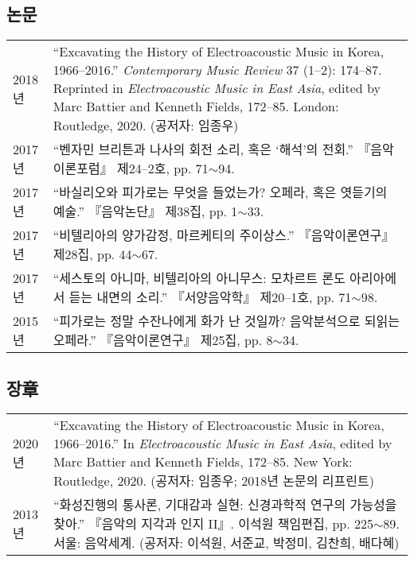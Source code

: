 \documentclass[dvipdfmx,a4paper]{article}
\begin{document}
  \subsection*{\small 논문}
  \hspace*{-0.25cm}
  \begin{tabular}{p{3.0cm} p{11cm}}
    2018년 & “Excavating the History of Electroacoustic Music in Korea, 1966–2016.” \textit{Contemporary Music Review} 37 (1–2): 174–87. Reprinted in \textit{Electroacoustic Music in East Asia}, edited by Marc Battier and Kenneth Fields, 172–85. London: Routledge, 2020. (공저자: 임종우)\\[2mm]
    
    2017년 & “벤자민 브리튼과 나사의 회전 소리, 혹은 ‘해석’의 전회.” 『음악이론포럼』 제24--2호, pp. 71$\sim$94.\\[2mm]
    
    2017년 & “바실리오와 피가로는 무엇을 들었는가? 오페라, 혹은 엿듣기의 예술.” 『음악논단』 제38집, pp. 1$\sim$33.\\[2mm]
    
    2017년 & “비텔리아의 양가감정, 마르케티의 주이상스.” 『음악이론연구』 제28집, pp. 44$\sim$67.\\[2mm]
    
    2017년 & “세스토의 아니마, 비텔리아의 아니무스: 모차르트 론도 아리아에서 듣는 내면의 소리.” 『서양음악학』 제20--1호, pp. 71$\sim$98.\\[2mm]
    
    2015년 & “피가로는 정말 수잔나에게 화가 난 것일까? 음악분석으로 되읽는 오페라.” 『음악이론연구』 제25집, pp. 8$\sim$34.
  \end{tabular}
  
  \subsection*{\small 장章}
  \hspace*{-0.25cm}
  \begin{tabular}{p{3.0cm} p{11.0cm}}
    2020년 & “Excavating the History of Electroacoustic Music in Korea,
    1966–2016.” In \textit{Electroacoustic Music in East Asia}, edited by Marc Battier and Kenneth Fields, 172--85. New York: Routledge, 2020. (공저자: 임종우; 2018년 논문의 리프린트)\\[2mm]
    
    2013년 & “화성진행의 통사론, 기대감과 실현: 신경과학적 연구의 가능성을 찾아.” 『음악의 지각과 인지 II』. 이석원 책임편집, pp. 225$\sim$89. 서울: 음악세계. (공저자: 이석원, 서준교, 박정미, 김찬희, 배다혜)
  \end{tabular}
  
\end{document}

